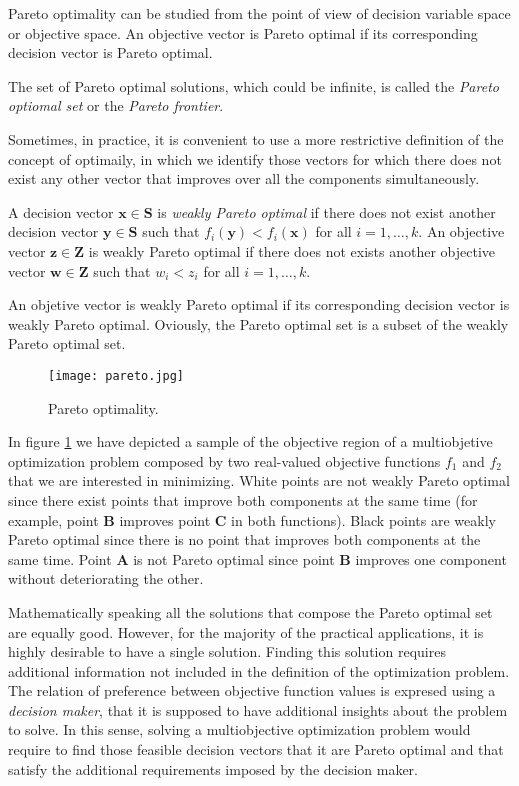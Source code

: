 {Pareto optimality can be studied from the point of view of decision variable space or objective space. An objective vector is Pareto optimal if its corresponding decision vector is Pareto optimal.

The set of Pareto optimal solutions, which could be infinite, is called the \emph{Pareto optiomal set} or the \emph{Pareto frontier}.

Sometimes, in practice, it is convenient to use a more restrictive definition of the concept of optimaily, in which we identify those vectors for which there does not exist any other vector that improves over all the components simultaneously.

\begin{definition}
A decision vector $\mathbf{x} \in \mathbf{S}$ is \emph{weakly Pareto optimal} if there does not exist another decision vector $\mathbf{y} \in \mathbf{S}$ such that $f_i ( \mathbf{y} ) < f_i ( \mathbf{x} )$ for all $i = 1, \ldots, k$. An objective vector $\mathbf{z} \in \mathbf{Z}$ is weakly Pareto optimal if there does not exists another objective vector $\mathbf{w} \in \mathbf{Z}$ such that $w_i < z_i$ for all $i = 1, \ldots, k$.
\end{definition}

An objetive vector is weakly Pareto optimal if its corresponding decision vector is weakly Pareto optimal. Oviously, the Pareto optimal set is a subset of the weakly Pareto optimal set.

\begin{example}
\label{ex:pareto}
\begin{figure}[h]
\centering\texttt{[image: pareto.jpg]}
\caption{\label{fig:pareto}Pareto optimality.}
\end{figure}
In figure \ref{fig:pareto} we have depicted a sample of the objective region of a multiobjetive optimization problem composed by two real-valued objective functions $f_1$ and $f_2$ that we are interested in minimizing. White points are not weakly Pareto optimal since there exist points that improve both components at the same time (for example, point $\mathbf{B}$ improves point $\mathbf{C}$ in both functions). Black points are weakly Pareto optimal since there is no point that improves both components at the same time. Point $\mathbf{A}$ is not Pareto optimal since point $\mathbf{B}$ improves one component without deteriorating the other.
\end{example}

Mathematically speaking all the solutions that compose the Pareto optimal set are equally good. However, for the majority of the practical applications, it is highly desirable to have a single solution. Finding this solution requires additional information not included in the definition of the optimization problem. The relation of preference between objective function values is expresed using a \emph{decision maker}, that it is supposed to have additional insights about the problem to solve. In this sense, solving a multiobjective optimization problem would require to find those feasible decision vectors that it are Pareto optimal and that satisfy the additional requirements imposed by the decision maker.

}
